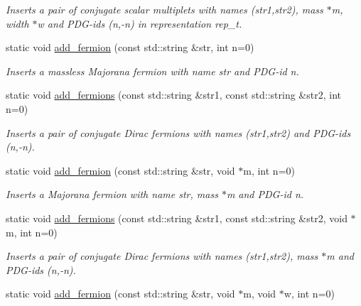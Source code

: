 \begin{DoxyCompactItemize}
\begin{DoxyCompactList}\small\item\em Inserts a pair of conjugate scalar multiplets with names (str1,str2), mass $\ast$m, width $\ast$w and P\-D\-G-\/ids (n,-\/n) in representation rep\-\_\-t. \end{DoxyCompactList}\item 
\hypertarget{a00370_a68b370343c09a6e02aee70732eed1242}{static void \hyperlink{a00370_a68b370343c09a6e02aee70732eed1242}{add\-\_\-fermion} (const std\-::string \&str, int n=0)}\label{a00370_a68b370343c09a6e02aee70732eed1242}

\begin{DoxyCompactList}\small\item\em Inserts a massless Majorana fermion with name str and P\-D\-G-\/id n. \end{DoxyCompactList}\item 
static void \hyperlink{a00370_a8d405f13336b9e6b339c62c40b73cd2b}{add\-\_\-fermions} (const std\-::string \&str1, const std\-::string \&str2, int n=0)
\begin{DoxyCompactList}\small\item\em Inserts a pair of conjugate Dirac fermions with names (str1,str2) and P\-D\-G-\/ids (n,-\/n). \end{DoxyCompactList}\item 
\hypertarget{a00370_aef88dbc0a38bbefca4827d67b2244867}{static void \hyperlink{a00370_aef88dbc0a38bbefca4827d67b2244867}{add\-\_\-fermion} (const std\-::string \&str, void $\ast$m, int n=0)}\label{a00370_aef88dbc0a38bbefca4827d67b2244867}

\begin{DoxyCompactList}\small\item\em Inserts a Majorana fermion with name str, mass $\ast$m and P\-D\-G-\/id n. \end{DoxyCompactList}\item 
\hypertarget{a00370_a78aefcded03d37c4267bd6f410199aa9}{static void \hyperlink{a00370_a78aefcded03d37c4267bd6f410199aa9}{add\-\_\-fermions} (const std\-::string \&str1, const std\-::string \&str2, void $\ast$m, int n=0)}\label{a00370_a78aefcded03d37c4267bd6f410199aa9}

\begin{DoxyCompactList}\small\item\em Inserts a pair of conjugate Dirac fermions with names (str1,str2), mass $\ast$m and P\-D\-G-\/ids (n,-\/n). \end{DoxyCompactList}\item 
\hypertarget{a00370_ac93469e0837a782225f2c803e847e290}{static void \hyperlink{a00370_ac93469e0837a782225f2c803e847e290}{add\-\_\-fermion} (const std\-::string \&str, void $\ast$m, void $\ast$w, int n=0)}\label{a00370_ac93469e0837a782225f2c803e847e290}


\end{DoxyCompactItemize}
